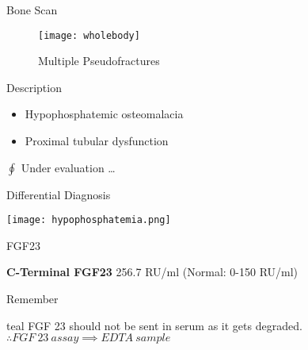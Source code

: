 \begin{frame} {Bone Scan}
\begin{center}
\begin{figure}
\texttt{[image: wholebody]}
    \caption{\tiny Multiple Pseudofractures}
\end{figure}	
\end{center}	
\end{frame}
\begin{frame} {Description}
	\begin{itemize}
		\item Hypophosphatemic osteomalacia
        \item Proximal tubular dysfunction
\end{itemize} 
\hspace{10pt} $\oint$ Under evaluation \ldots
\end{frame}


\begin{frame}{Differential Diagnosis}
	\begin{center}
		\texttt{[image: hypophosphatemia.png]}
\end{center}
\end{frame}
\begin{frame}{FGF23}
	\begin{block}{\textbf{C-Terminal FGF23}}
		256.7 RU/ml  (Normal: 0-150 RU/ml) 
\end{block}
\medskip\begin{bclogo} [logo=\bcbombe,barre=none,noborder=true]{Remember}
	\begin{gbar} {teal}
		FGF 23 should not be sent in serum as it gets degraded. \\
		$ \therefore FGF \ 23 \ assay \implies EDTA \ sample $
	\end{gbar}
\end{bclogo}

\end{frame}



